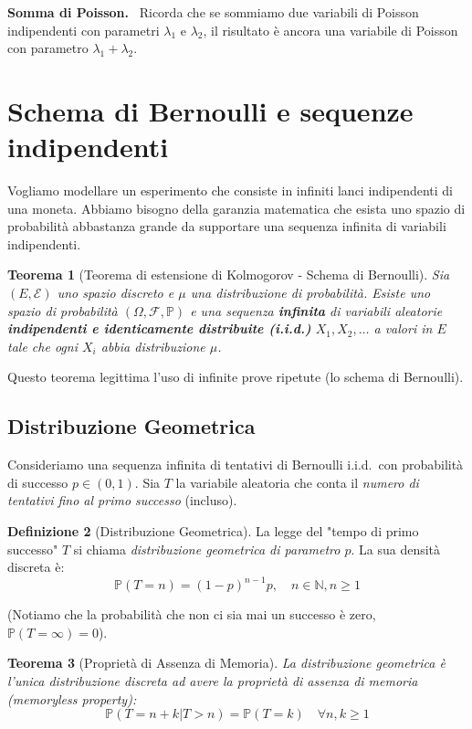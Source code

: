 \documentclass[11pt, a4paper]{report}
\theoremstyle{plain}
\newtheorem{theorem}{Teorema}[chapter]
\theoremstyle{definition}
\newtheorem{definition}[theorem]{Definizione}
\theoremstyle{remark}
\newenvironment{hint}[1][Hint]
{\begin{mdframed}[backgroundcolor=blue!5, linecolor=blue!50, linewidth=2pt, topline=false, rightline=false, bottomline=false]
\textbf{\textsf{#1.}}\ }
{\end{mdframed}}
\newcommand{\PP}{\mathbb{P}}
\newcommand{\F}{\mathcal{F}}
\newcommand{\N}{\mathbb{N}}
\newcommand{\1}{\mathbf{1}}
\begin{document}
\begin{hint}[Somma di Poisson]
    Ricorda che se sommiamo due variabili di Poisson indipendenti con parametri $\lambda_1$ e $\lambda_2$, il risultato è ancora una variabile di Poisson con parametro $\lambda_1 + \lambda_2$.
\end{hint}

\section{Schema di Bernoulli e sequenze indipendenti}

Vogliamo modellare un esperimento che consiste in infiniti lanci indipendenti di una moneta. Abbiamo bisogno della garanzia matematica che esista uno spazio di probabilità abbastanza grande da supportare una sequenza infinita di variabili indipendenti.

\begin{theorem}[Teorema di estensione di Kolmogorov - Schema di Bernoulli]
Sia $(E, \mathcal{E})$ uno spazio discreto e $\mu$ una distribuzione di probabilità. Esiste uno spazio di probabilità $(\Omega, \F, \PP)$ e una sequenza \textbf{infinita} di variabili aleatorie \textbf{indipendenti e identicamente distribuite (i.i.d.)} $X_1, X_2, \dots$ a valori in $E$ tale che ogni $X_i$ abbia distribuzione $\mu$.
\end{theorem}

Questo teorema legittima l'uso di infinite prove ripetute (lo schema di Bernoulli).

\subsection{Distribuzione Geometrica}

Consideriamo una sequenza infinita di tentativi di Bernoulli i.i.d.\ con probabilità di successo $p \in (0,1)$. Sia $T$ la variabile aleatoria che conta il \emph{numero di tentativi fino al primo successo} (incluso). 

\begin{definition}[Distribuzione Geometrica]
La legge del "tempo di primo successo" $T$ si chiama \emph{distribuzione geometrica di parametro $p$}. La sua densità discreta è:
\[ \PP(T = n) = (1-p)^{n-1} p, \quad n \in \N, n \ge 1 \]
\end{definition}
(Notiamo che la probabilità che non ci sia mai un successo è zero, $\PP(T=\infty)=0$).

\begin{theorem}[Proprietà di Assenza di Memoria]
La distribuzione geometrica è l'unica distribuzione discreta ad avere la proprietà di assenza di memoria (\emph{memoryless property}):
\[ \PP(T = n + k | T > n) = \PP(T = k) \quad \forall n, k \ge 1 \]
\end{theorem}
\end{document}
